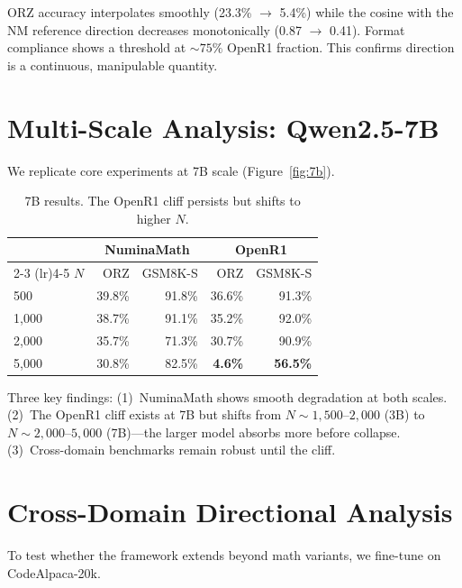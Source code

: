 \documentclass{article}
\begin{document}
ORZ accuracy interpolates smoothly (23.3\% $\to$ 5.4\%) while the cosine with the NM reference direction decreases monotonically (0.87 $\to$ 0.41). Format compliance shows a threshold at ${\sim}75\%$ OpenR1 fraction. This confirms direction is a continuous, manipulable quantity.

\section{Multi-Scale Analysis: Qwen2.5-7B}
\label{sec:7b}

We replicate core experiments at 7B scale (Figure~\ref{fig:7b}).

\begin{table}[h]
\centering
\caption{7B results. The OpenR1 cliff persists but shifts to higher $N$.}
\label{tab:7b}
\small
\begin{tabular}{@{}lrrrr@{}}
\toprule
& \multicolumn{2}{c}{NuminaMath} & \multicolumn{2}{c}{OpenR1} \\
\cmidrule(lr){2-3} \cmidrule(lr){4-5}
$N$ & ORZ & GSM8K-S & ORZ & GSM8K-S \\
\midrule
500 & 39.8\% & 91.8\% & 36.6\% & 91.3\% \\
1,000 & 38.7\% & 91.1\% & 35.2\% & 92.0\% \\
2,000 & 35.7\% & 71.3\% & 30.7\% & 90.9\% \\
5,000 & 30.8\% & 82.5\% & \textbf{4.6\%} & \textbf{56.5\%} \\
\bottomrule
\end{tabular}
\end{table}

Three key findings: (1)~NuminaMath shows smooth degradation at both scales. (2)~The OpenR1 cliff exists at 7B but shifts from $N{\sim}1{,}500$--$2{,}000$ (3B) to $N{\sim}2{,}000$--$5{,}000$ (7B)---the larger model absorbs more before collapse. (3)~Cross-domain benchmarks remain robust until the cliff.

\section{Cross-Domain Directional Analysis}
\label{sec:cross-domain}

To test whether the framework extends beyond math variants, we fine-tune on CodeAlpaca-20k.
\end{document}
